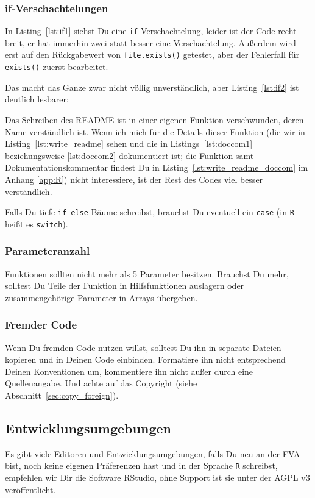 \documentclass[twoside]{scrartcl}
\providecommand{\R}{\texttt{R}}
\providecommand{\code}[1]{\texttt{#1}}
\begin{document}
\subsubsection{if-Verschachtelungen\label{sec:if}}
In Listing~\ref{lst:if1} siehst Du eine \code{if}-Verschachtelung, leider ist
der Code recht breit, er hat immerhin zwei statt besser eine Verschachtelung.
Au\ss{}erdem wird erst auf den R\"u{}ckgabewert von
\code{file.exists()} getestet, aber der Fehlerfall f\"u{}r
\code{exists()} zuerst bearbeitet.

Das macht das Ganze zwar nicht v\"o{}llig unverst\"a{}ndlich, aber
Listing~\ref{lst:if2} ist deutlich lesbarer:

Das Schreiben des README ist in
einer eigenen Funktion verschwunden, deren Name verst\"a{}ndlich ist. Wenn ich
mich f\"u{}r die Details dieser Funktion 
(die wir in Listing~\ref{lst:write_readme} sehen und die in
Listings~\ref{lst:doccom1} beziehungsweise \ref{lst:doccom2} dokumentiert ist;
die Funktion samt Dokumentationskommentar findest Du in 
Listing~\ref{lst:write_readme_doccom} 
im Anhang \ref{app:R})
nicht interessiere, ist der Rest des Codes viel besser verst\"a{}ndlich.


Falls Du tiefe \code{if-else}-B\"a{}ume schreibst, brauchst Du eventuell 
ein \code{case} (in \R{} hei\ss{}t es \code{switch}).
\subsubsection{Parameteranzahl\label{sec:parameteranzahl}} 
Funktionen sollten nicht mehr als 5 Parameter besitzen.
Brauchst Du mehr, solltest Du Teile der Funktion in Hilfsfunktionen auslagern
oder zusammengeh\"o{}rige Parameter in Arrays \"u{}bergeben.

\subsubsection{Fremder Code} 
Wenn Du fremden Code nutzen willst, solltest Du ihn in separate Dateien kopieren
und in Deinen Code einbinden. 
Formatiere ihn nicht entsprechend Deinen Konventionen um, 
kommentiere ihn nicht au\ss{}er durch eine Quellenangabe. 
Und achte auf das Copyright (siehe Abschnitt~\ref{sec:copy_foreign}).

\subsection{Entwicklungsumgebungen}
Es gibt viele Editoren und Entwicklungsumgebungen, falls Du neu an der FVA bist,
noch keine
eigenen Pr\"a{}ferenzen hast und in der Sprache \R{} schreibst, empfehlen wir 
Dir die Software \href{http://www.rstudio.com/products/rstudio/}{RStudio}, 
ohne Support ist sie unter der AGPL v3 ver\"o{}ffentlicht.
\end{document}
